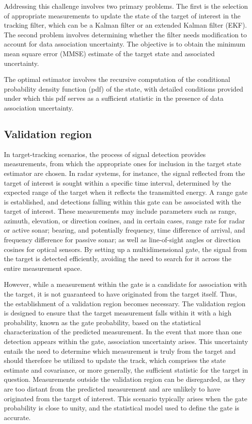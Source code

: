Addressing this challenge involves two primary problems. The first is the selection of appropriate measurements to update the state of the target of interest in the tracking filter, which can be a Kalman filter or an extended Kalman filter (EKF). The second problem involves determining whether the filter needs modification to account for data association uncertainty. The objective is to obtain the minimum mean square error (MMSE) estimate of the target state and associated uncertainty.

The optimal estimator involves the recursive computation of the conditional probability density function (pdf) of the
state, with detailed conditions provided under which this pdf serves as a sufficient statistic in the presence of
data association uncertainty.
  \subsection{Validation region}

In target-tracking scenarios, the process of signal detection provides measurements, from which the appropriate ones for inclusion in the target state estimator are chosen. In radar systems, for instance, the signal reflected from the target of interest is sought within a specific time interval, determined by the expected range of the target when it reflects the transmitted energy. A range gate is established, and detections falling within this gate can be associated with the target of interest. These measurements may include parameters such as range, azimuth, elevation, or direction cosines, and in certain cases, range rate for radar or active sonar; bearing, and potentially frequency, time difference of arrival, and frequency difference for passive sonar; as well as line-of-sight angles or direction cosines for optical sensors. By setting up a multidimensional gate, the signal from the target is detected efficiently, avoiding the need to search for it across the entire measurement space.

However, while a measurement within the gate is a candidate for association with the target, it is not guaranteed to have originated from the target itself. Thus, the establishment of a validation region becomes necessary. The validation region is designed to ensure that the target measurement falls within it with a high probability, known as the gate probability, based on the statistical characterization of the predicted measurement. In the event that more than one detection appears within the gate, association uncertainty arises. This uncertainty entails the need to determine which measurement is truly from the target and should therefore be utilized to update the track, which comprises the state estimate and covariance, or more generally, the sufficient statistic for the target in question. Measurements outside the validation region can be disregarded, as they are too distant from the predicted measurement and are unlikely to have originated from the target of interest. This scenario typically arises when the gate probability is close to unity, and the statistical model used to define the gate is accurate.
